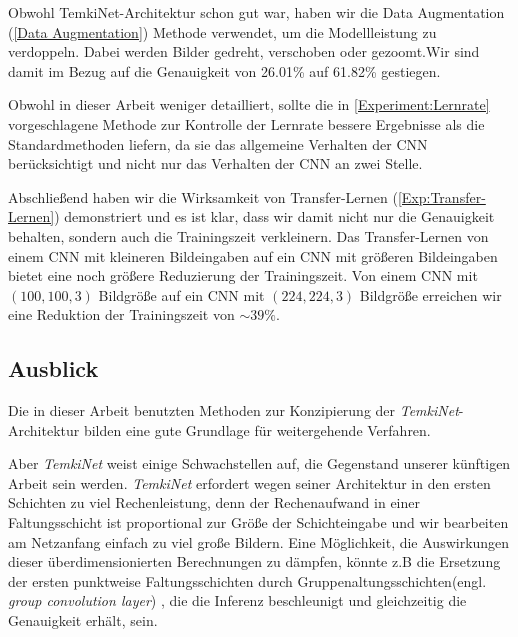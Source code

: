 \documentclass[12pt,a4paper]{scrartcl}
\numberwithin{equation}{section}
\begin{document}
Obwohl TemkiNet-Architektur schon gut war, haben wir die Data Augmentation (\ref{Data Augmentation}) Methode verwendet, um die Modellleistung zu verdoppeln. Dabei werden Bilder gedreht, verschoben oder gezoomt.Wir sind damit im Bezug auf die Genauigkeit von 26.01\% auf 61.82\% gestiegen.

Obwohl in dieser Arbeit weniger detailliert, sollte die in \ref{Experiment:Lernrate} vorgeschlagene Methode zur Kontrolle der Lernrate bessere Ergebnisse als die Standardmethoden liefern, da sie das allgemeine Verhalten der CNN berücksichtigt und nicht nur das Verhalten der CNN an zwei Stelle.

Abschließend haben wir die Wirksamkeit von Transfer-Lernen (\ref{Exp:Transfer-Lernen}) demonstriert und es ist klar, dass wir damit nicht nur die Genauigkeit behalten, sondern auch die Trainingszeit verkleinern. Das Transfer-Lernen von einem CNN mit kleineren Bildeingaben auf ein CNN mit größeren Bildeingaben bietet eine noch größere Reduzierung der Trainingszeit. Von einem CNN mit $ (100, 100, 3) $  Bildgröße auf ein CNN mit $ (224,224,3) $ Bildgröße  erreichen wir eine Reduktion der Trainingszeit von $ \sim39\% $.

\subsection{Ausblick}

Die in dieser Arbeit benutzten Methoden zur Konzipierung der \textit{TemkiNet}-Architektur bilden eine gute Grundlage für weitergehende Verfahren. 

Aber \textit{TemkiNet} weist einige Schwachstellen auf, die Gegenstand unserer künftigen Arbeit sein werden. \textit{TemkiNet} erfordert wegen seiner Architektur in den ersten Schichten zu viel Rechenleistung, denn der Rechenaufwand in einer Faltungsschicht ist proportional zur Größe der Schichteingabe und wir bearbeiten am Netzanfang einfach zu viel große Bildern. Eine Möglichkeit, die Auswirkungen dieser überdimensionierten Berechnungen zu dämpfen, könnte z.B die Ersetzung der ersten punktweise Faltungsschichten durch Gruppenaltungsschichten(engl. \textit{group convolution layer}) \cite{AlexNet}, die die Inferenz beschleunigt und gleichzeitig die Genauigkeit erhält, sein.
\end{document}
